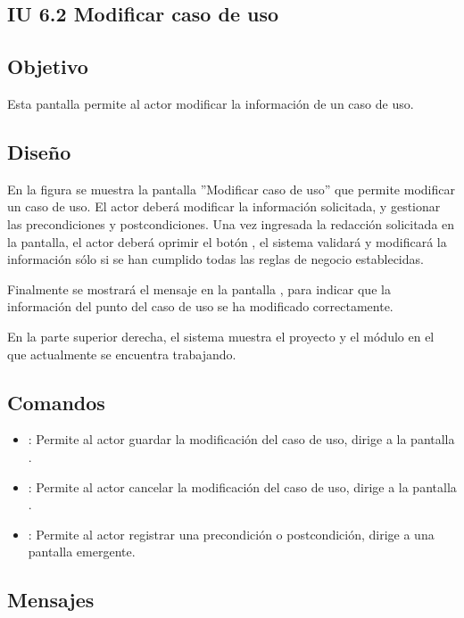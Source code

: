 \subsection{IU 6.2 Modificar caso de uso}

\subsection{Objetivo}
	Esta pantalla permite al actor modificar la información de un caso de uso.
\subsection{Diseño}
	En la figura  se muestra la pantalla ''Modificar caso de uso'' que permite modificar un caso de uso. El actor deberá modificar la información solicitada, y gestionar las precondiciones y postcondiciones.
	Una vez ingresada la redacción solicitada en la pantalla, el actor deberá oprimir el botón , el sistema validará y modificará la información sólo si se han cumplido todas las reglas de negocio establecidas.
	
	Finalmente se mostrará el mensaje  en la pantalla , para indicar que la información del punto del caso de uso se ha modificado correctamente.
	
	En la parte superior derecha, el sistema muestra el proyecto y el módulo en el que actualmente se encuentra trabajando.

\subsection{Comandos}
\begin{itemize}
	\item {}: Permite al actor guardar la modificación del caso de uso, dirige a la pantalla .
	\item {}: Permite al actor cancelar la modificación del caso de uso, dirige a la pantalla .
	\item {}: Permite al actor registrar una precondición o postcondición, dirige a una pantalla emergente.
\end{itemize}

\subsection{Mensajes}

